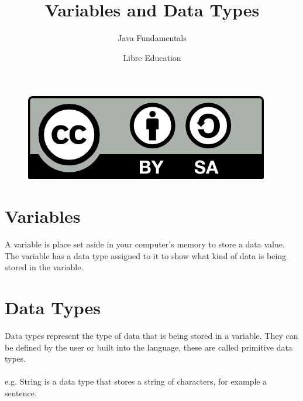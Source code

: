 \documentclass[a4paper]{article}
\title{Variables and Data Types}
\subtitle{Java Fundamentals}
\date{}
\author{Libre Education}
\begin{document}
\maketitle


\begin{figure}[b]
\includegraphics{BY-SA}
\centering
\end{figure}

\newpage

\section*{Variables}

A variable is place set aside in your computer’s memory to store a data value. The variable has a data type assigned to it to show what kind of data is being stored in the variable.

\section*{Data Types}

Data types represent the type of data that is being stored in a variable. They can be defined by the user or built into the language, these are called primitive data types.
\\\\
e.g. String is a data type that stores a string of characters, for example a sentence.
\end{document}
